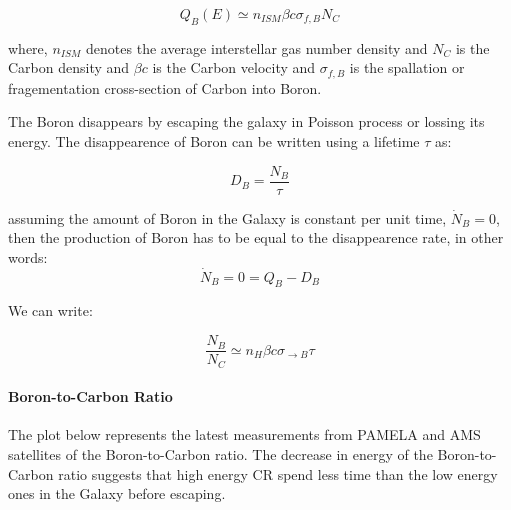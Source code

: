 \documentclass[
  letterpaper,
  DIV=11,
  numbers=noendperiod]{scrreprt}
\let\oldparagraph\paragraph
\renewcommand{\paragraph}[1]{\oldparagraph{#1}\mbox{}}
\begin{document}
\[Q_B(E) \simeq n_{ISM} \beta c \sigma_{f,B} N_C\]

where, \(n_{ISM}\) denotes the average interstellar gas number density
and \(N_C\) is the Carbon density and \(\beta c\) is the Carbon velocity
and \(\sigma_{f,B}\) is the spallation or fragementation cross-section
of Carbon into Boron.

The Boron disappears by escaping the galaxy in Poisson process or
lossing its energy. The disappearence of Boron can be written using a
lifetime \(\tau\) as:

\[D_B = \frac{N_B}{\tau}\]

assuming the amount of Boron in the Galaxy is constant per unit time,
\(\dot{N}_B = 0\), then the production of Boron has to be equal to the
disappearence rate, in other words: \[\dot{N}_B = 0 = Q_B - D_B\]

We can write:

\[\frac{N_B}{N_C} \simeq n_{H} \beta c \sigma_{\rightarrow B}\tau\]

\paragraph{Boron-to-Carbon Ratio}\label{boron-to-carbon-ratio}

The plot below represents the latest measurements from PAMELA and AMS
satellites of the Boron-to-Carbon ratio. The decrease in energy of the
Boron-to-Carbon ratio suggests that high energy CR spend less time than
the low energy ones in the Galaxy before escaping.
\end{document}
